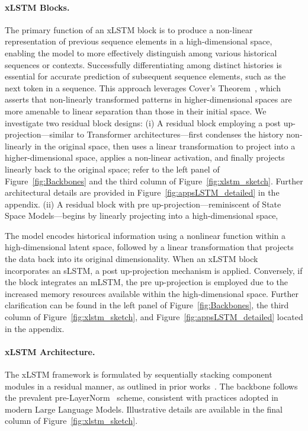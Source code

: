 \paragraph{xLSTM Blocks.}
\label{sec:xLSTMblock}
The primary function of an xLSTM block is to produce a non-linear representation of previous sequence elements in a high-dimensional space, enabling the model to more effectively distinguish among various historical sequences or contexts. Successfully differentiating among distinct histories is essential for accurate prediction of subsequent sequence elements, such as the next token in a sequence. This approach leverages Cover’s Theorem~\citep{Cover:65}, which asserts that non-linearly transformed patterns in higher-dimensional spaces are more amenable to linear separation than those in their initial space. We investigate two residual block designs: (i) A residual block employing a post up-projection—similar to Transformer architectures—first condenses the history non-linearly in the original space, then uses a linear transformation to project into a higher-dimensional space, applies a non-linear activation, and finally projects linearly back to the original space; refer to the left panel of Figure~\ref{fig:Backbones} and the third column of Figure~\ref{fig:xlstm_sketch}. Further architectural details are provided in Figure~\ref{fig:appsLSTM_detailed} in the appendix. (ii) A residual block with pre up-projection—reminiscent of State Space Models—begins by linearly projecting into a high-dimensional space,

The model encodes historical information using a nonlinear function within a high-dimensional latent space, followed by a linear transformation that projects the data back into its original dimensionality. When an xLSTM block incorporates an sLSTM, a post up-projection mechanism is applied. Conversely, if the block integrates an mLSTM, the pre up-projection is employed due to the increased memory resources available within the high-dimensional space. Further clarification can be found in the left panel of Figure~\ref{fig:Backbones}, the third column of Figure~\ref{fig:xlstm_sketch}, and Figure~\ref{fig:appsLSTM_detailed} located in the appendix.

\paragraph{xLSTM Architecture. }
\label{sec:xLSTMarchitecure}
The xLSTM framework is formulated by sequentially stacking component modules in a residual manner, as outlined in prior works~\citep{Srivastava:15,He:16}. The backbone follows the prevalent pre-LayerNorm~\citep{Ba:16b} scheme, consistent with practices adopted in modern Large Language Models. Illustrative details are available in the final column of Figure~\ref{fig:xlstm_sketch}.

